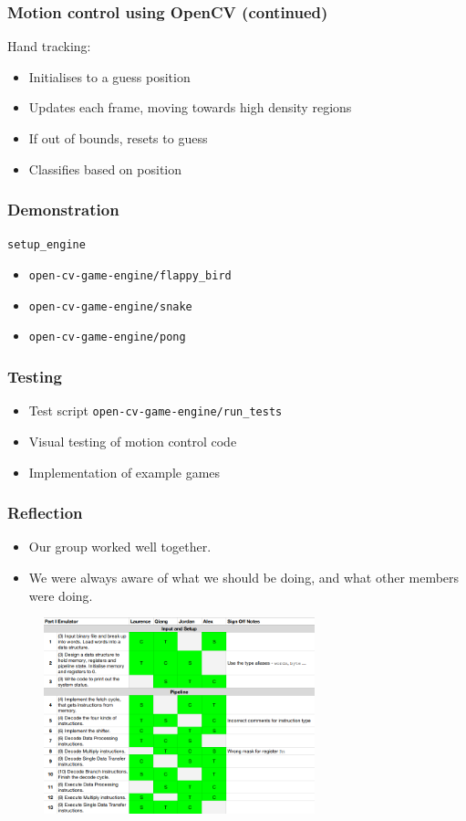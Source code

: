 \documentclass{beamer}
\begin{document}
\begin{frame}
	\frametitle{Motion control using OpenCV (continued)}
	Hand tracking:
	\begin{itemize}
		\item Initialises to a guess position
		\item Updates each frame, moving towards high density regions
		\item If out of bounds, resets to guess
		\item Classifies based on position
	\end{itemize}
\end{frame}

\begin{frame}
	\frametitle{Demonstration}
	\texttt{setup\_engine}
	\begin{itemize}
		\item \texttt{open-cv-game-engine/flappy\_bird}
		\item \texttt{open-cv-game-engine/snake}
		\item \texttt{open-cv-game-engine/pong}
	\end{itemize}
\end{frame}

\begin{frame}
	\frametitle{Testing}
	\begin{itemize}
		\item Test script \texttt{open-cv-game-engine/run\_tests}
		\item Visual testing of motion control code
		\item Implementation of example games
	\end{itemize}
\end{frame}

\begin{frame}
\frametitle{Reflection}
\begin{itemize}
	\item Our group worked well together.
	\item We were always aware of what we should be doing, and what other members were doing.
\end{itemize}
\begin{figure}
	\includegraphics[width=0.7\textwidth]{Presentation/spreadsheet.png}
\end{figure}
\end{frame}
\end{document}
